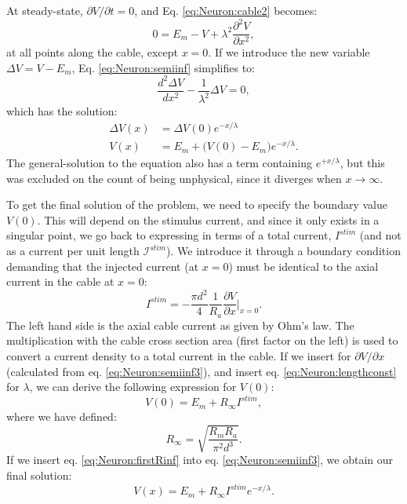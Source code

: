 At steady-state, $\partial V/\partial t = 0$, and Eq. \ref{eq:Neuron:cable2} becomes:
\begin{equation}
0 = E_m-V +  \lambda^2 \frac{\partial^2 V}{\partial x^2}, 
\label{eq:Neuron:semiinf}
\end{equation}
at all points along the cable, except $x=0$. If we introduce the new variable $\Delta{V}=V-E_m$, Eq. \ref{eq:Neuron:semiinf} simplifies to:
\begin{equation}
\frac{d^2 \Delta{V}}{d x^2} -  \frac{1}{\lambda^2} \Delta{V}=0, 
\label{eq:Neuron:semiinf2}
\end{equation}
which has the solution:
\begin{align}
\Delta{V}(x) &= \Delta{V}(0) e^{-x/\lambda} \\
V(x) &= E_m + \big( V(0)-E_m \big) e^{-x/\lambda}.
\label{eq:Neuron:semiinf3}
\end{align}
The general-solution to the equation also has a term containing $e^{+x/\lambda}$, but this was excluded on the count of being unphysical, since it diverges when $x \rightarrow \infty$. 

To get the final solution of the problem, we need to specify the boundary value $V(0)$. This will depend on the stimulus current, and since it only exists in a singular point, we go back to expressing in terms of a total current, $I^{stim}$ (and not as a current per unit length $\mathcal{I}^{stim}$). We introduce it through a boundary condition demanding that the injected current (at $x=0$) must be identical to the axial current in the cable at $x=0$:
\begin{equation}
I^{stim} = - \frac{\pi d^2}{4}\frac{1}{R_a} \frac{\partial V}{\partial x}   \Big|_{x=0}.
\end{equation}
The left hand side is the axial cable current as given by Ohm's law. The multiplication with the cable cross section area (first factor on the left) is used to convert a current density to a total current in the cable. If we insert for $\partial V/\partial x$ (calculated from eq. \ref{eq:Neuron:semiinf3}), and insert eq. \ref{eq:Neuron:lengthconst} for $\lambda$, we can derive the following expression for $V(0)$:
\begin{equation}
V(0) = E_m + R_{\infty}I^{stim}, 
\label{eq:Neuron:firstRinf}
\end{equation}
where we have defined:
\begin{equation}
R_{\infty} = \sqrt{\frac{R_m R_a}{\pi^2 d^3}}.
\label{eq:Neuron:Rinf}
\end{equation}
If we insert eq. \ref{eq:Neuron:firstRinf} into eq. \ref{eq:Neuron:semiinf3}, we obtain our final solution:
\begin{equation}
V(x) = E_m +R_{\infty}I^{stim}  e^{-x/\lambda}.
\label{eq:Neuron:semiinf4}
\end{equation}

